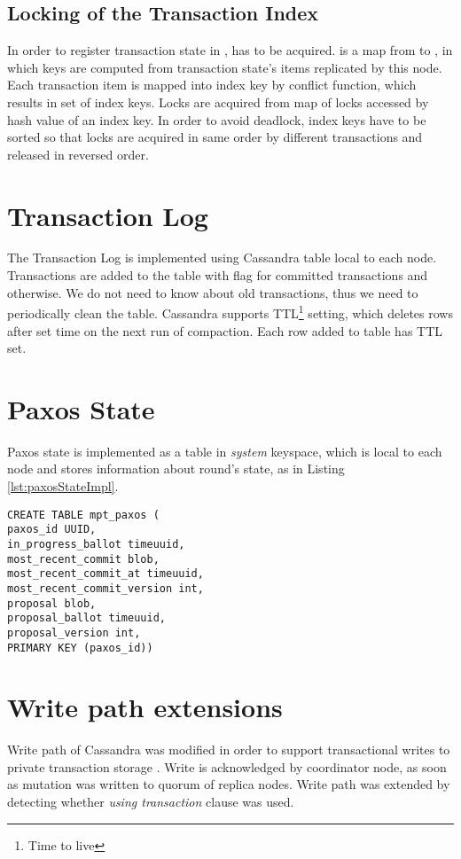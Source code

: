 \subsection{Locking of the Transaction Index}
In order to register transaction state \txState in \txIndex, \txIndex has to be acquired.
\txIndex is a map from  to , in which keys are computed from transaction state’s items replicated by this node. Each transaction item \txItem is mapped into index key by conflict function, which results in set of index keys. Locks are acquired from map of locks accessed by hash value of an index key. In order to avoid deadlock, index keys have to be sorted so that locks are acquired in same order by different transactions and released in reversed order.



\section{Transaction Log}
The Transaction Log \txLog is implemented using Cassandra table local to each node. 
Transactions are added to the table with flag  for committed transactions and  otherwise. We do not need to know about old transactions, thus we need to periodically clean the table. Cassandra supports TTL\footnote{Time to live} setting, which deletes rows after set time on the next run of compaction. Each row added to \txLog table has TTL set.


\section{Paxos State}
Paxos state is implemented as a table in \emph{system} keyspace, which is local to each node and stores information about \paxos round's state, as in Listing \ref{lst:paxosStateImpl}.

\begin{lstlisting}[style=outcode,label={lst:paxosStateImpl},caption={Table definition for multi partition transactions paxos state}]
CREATE TABLE mpt_paxos (
paxos_id UUID,
in_progress_ballot timeuuid,
most_recent_commit blob,
most_recent_commit_at timeuuid,
most_recent_commit_version int,
proposal blob,
proposal_ballot timeuuid,
proposal_version int,
PRIMARY KEY (paxos_id))
\end{lstlisting}



\section{Write path extensions}
Write path of Cassandra \cite{CassandraWritePath} was modified in order to support transactional writes to private transaction storage \txStorage.
Write is acknowledged by coordinator node, as soon as mutation  was written to quorum of replica nodes.
Write path was extended by detecting whether \emph{using transaction} clause was used. 

